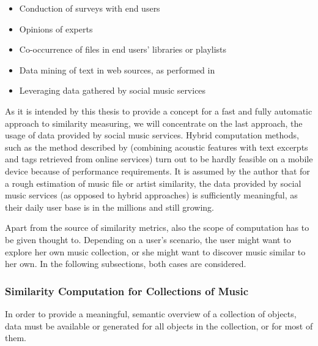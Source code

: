 \begin{itemize}
	\item Conduction of surveys with end users
	\item Opinions of experts
	\item Co-occurrence of files in end users' libraries or playlists
	\item Data mining of text in web sources, as performed in \cite{Whitman02inferringdescriptions}
	\item Leveraging data gathered by social music services
\end{itemize}

As it is intended by this thesis to provide a concept for a fast and fully automatic approach to similarity
measuring, we will concentrate on the last approach, the usage of data provided by social music services.
Hybrid computation methods, such as the method described by \cite{mcfee09_hesas} (combining acoustic 
features with text excerpts and tags retrieved from online services) turn out to be hardly feasible on a 
mobile device because of performance requirements. It is assumed by the author that for a rough estimation 
of music file or artist similarity, the data provided by social music services (as opposed to hybrid 
approaches) is sufficiently meaningful, as their daily user base is in the millions and still growing.

Apart from the source of similarity metrics, also the scope of computation has to be given thought to.
Depending on a user's scenario, the user might want to explore her own music collection, or she might want
to discover music similar to her own. In the following subsections, both cases are considered.

\subsubsection{Similarity Computation for Collections of Music}

In order to provide a meaningful, semantic overview of a collection of objects, data must be available 
or generated for all objects in the collection, or for most of them. 


